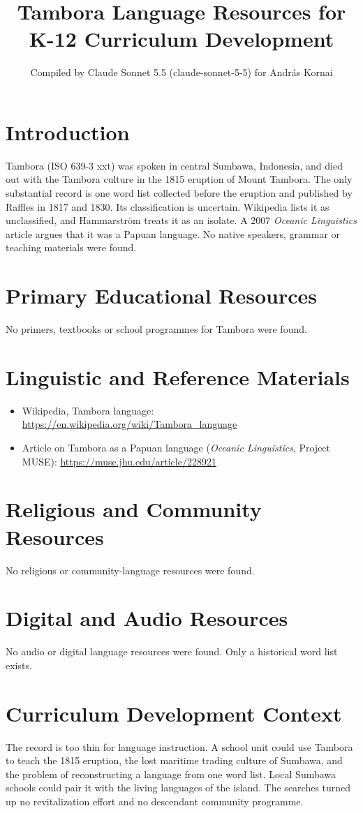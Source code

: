\documentclass[12pt]{article}
\title{Tambora Language Resources for K-12 Curriculum Development}
\author{Compiled by Claude Sonnet 5.5 (claude-sonnet-5-5) for Andr\'as Kornai}
\date{}
\begin{document}
\maketitle

\section{Introduction}
Tambora (ISO 639-3 xxt) was spoken in central Sumbawa, Indonesia, and died out with the Tambora culture in the 1815 eruption of Mount Tambora. The only substantial record is one word list collected before the eruption and published by Raffles in 1817 and 1830. Its classification is uncertain. Wikipedia lists it as unclassified, and Hammarström treats it as an isolate. A 2007 \emph{Oceanic Linguistics} article argues that it was a Papuan language. No native speakers, grammar or teaching materials were found.

\section{Primary Educational Resources}
No primers, textbooks or school programmes for Tambora were found.

\section{Linguistic and Reference Materials}
\begin{itemize}
\item Wikipedia, Tambora language: \url{https://en.wikipedia.org/wiki/Tambora_language}
\item Article on Tambora as a Papuan language (\emph{Oceanic Linguistics}, Project MUSE): \url{https://muse.jhu.edu/article/228921}
\end{itemize}

\section{Religious and Community Resources}
No religious or community-language resources were found.

\section{Digital and Audio Resources}
No audio or digital language resources were found. Only a historical word list exists.

\section{Curriculum Development Context}
The record is too thin for language instruction. A school unit could use Tambora to teach the 1815 eruption, the lost maritime trading culture of Sumbawa, and the problem of reconstructing a language from one word list. Local Sumbawa schools could pair it with the living languages of the island. The searches turned up no revitalization effort and no descendant community programme.
\end{document}
